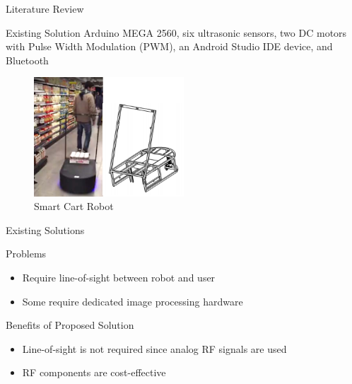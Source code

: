 \documentclass{beamer}
\begin{document}

\begin{frame}{Literature Review}
  \begin{block}{Existing Solution}
    Arduino MEGA 2560, six ultrasonic sensors, two DC motors with Pulse Width Modulation (PWM), an Android Studio IDE device, and Bluetooth~\cite{Rawashdeh2017-Person}
  \end{block}
    \begin{figure}[b]
        \centering
        \includegraphics[width=0.50\textwidth]{figs/img/SmartCart}
        \caption{Smart Cart Robot}
    \end{figure}
\end{frame}


\begin{frame}{Existing Solutions}
  \begin{block}{Problems}
    \begin{itemize}
      \item Require line-of-sight between robot and user
      \item Some require dedicated image processing hardware
    \end{itemize}
  \end{block}
  \pause
  \begin{block}{Benefits of Proposed Solution}
    \begin{itemize}
      \item Line-of-sight is not required since analog RF signals are used
      \item RF components are cost-effective
    \end{itemize}
  \end{block}
\end{frame}

\end{document}
